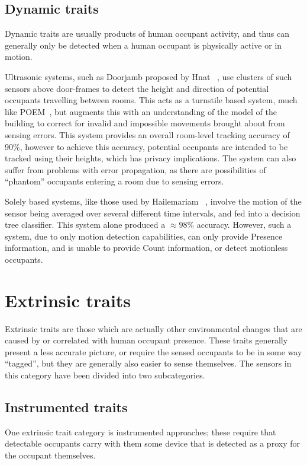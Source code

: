 \documentclass[../thesis/thesis.tex]{subfiles}
\begin{document}
\subsection{Dynamic traits}
\label{subsubsec:litreview:sensors:intrinsic:dynamic}
Dynamic traits are usually products of human occupant activity, and thus can generally only be detected when a human occupant is physically active or in motion.

Ultrasonic systems, such as Doorjamb proposed by Hnat \etal~\cite{hnat2012doorjamb}, use clusters of such sensors above door-frames to detect the height and direction of potential occupants travelling between rooms. This acts as a turnstile based system, much like POEM~\cite{erickson2013poem}, but augments this with an understanding of the model of the building to correct for invalid and impossible movements brought about from sensing errors. This system provides an overall room-level tracking accuracy of 90\%, however to achieve this accuracy, potential occupants are intended to be tracked using their heights, which has privacy implications. The system can also suffer from problems with error propagation, as there are possibilities of ``phantom'' occupants entering a room due to sensing errors.

Solely \pir based systems, like those used by Hailemariam \etal~\cite{hailemariam2011real}, involve the motion of the sensor being averaged over several different time intervals, and fed into a decision tree classifier. This \pir system alone produced a $\approx98\%$ accuracy. However, such a system, due to only motion detection capabilities, can only provide Presence information, and is unable to provide Count information, or detect motionless occupants.

\section{Extrinsic traits}
\label{subsec:litreview:sensors:extrinsic}
Extrinsic traits are those which are actually other environmental changes that are caused by or correlated with human occupant presence. These traits generally present a less accurate picture, or require the sensed occupants to be in some way ``tagged'', but they are generally also easier to sense themselves. The sensors in this category have been divided into two subcategories.

\subsection{Instrumented traits}
\label{subsubsec:litreview:sensors:extrinsic:instrumented}
One extrinsic trait category is instrumented approaches; these require that detectable occupants carry with them some device that is detected as a proxy for the occupant themselves.
\end{document}
